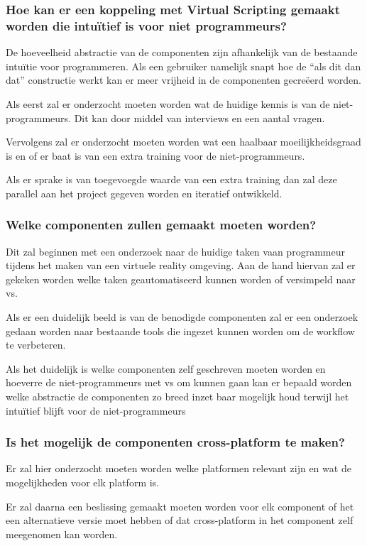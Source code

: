 \subsubsection{Hoe kan er een koppeling met Virtual Scripting gemaakt worden die intuïtief is voor niet programmeurs?}

De hoeveelheid abstractie van de componenten zijn afhankelijk van de bestaande intuïtie voor programmeren. Als een gebruiker namelijk snapt hoe de “als dit dan dat” constructie werkt kan er meer vrijheid in de componenten gecreëerd worden.

Als eerst zal er onderzocht moeten worden wat de huidige kennis is van de niet-programmeurs. Dit kan door middel van interviews en een aantal vragen.

Vervolgens zal er onderzocht moeten worden wat een haalbaar moeilijkheidsgraad is en of er baat is van een extra training voor de niet-programmeurs.

Als er sprake is van toegevoegde waarde van een extra training dan zal deze parallel aan het project gegeven worden en iteratief ontwikkeld.

\subsubsection{Welke componenten zullen gemaakt moeten worden?}
Dit zal beginnen met een onderzoek naar de huidige taken vaan programmeur tijdens het maken van een virtuele reality omgeving. Aan de hand hiervan zal er gekeken worden welke taken geautomatiseerd kunnen worden of versimpeld naar \gls{vs}.

Als er een duidelijk beeld is van de benodigde componenten zal er een onderzoek gedaan worden naar bestaande tools die ingezet kunnen worden om de workflow te verbeteren.

Als het duidelijk is welke componenten zelf geschreven moeten worden en hoeverre de niet-programmeurs met \gls{vs} om kunnen gaan kan er bepaald worden welke abstractie de componenten zo breed inzet baar mogelijk houd terwijl het intuïtief blijft voor de niet-programmeurs

\subsubsection{Is het mogelijk de componenten cross-platform te maken?}
Er zal hier onderzocht moeten worden welke platformen relevant zijn en wat de mogelijkheden voor elk platform is.

Er zal daarna een beslissing gemaakt moeten worden voor elk component of het een alternatieve versie moet hebben of dat cross-platform in het component zelf meegenomen kan worden.
